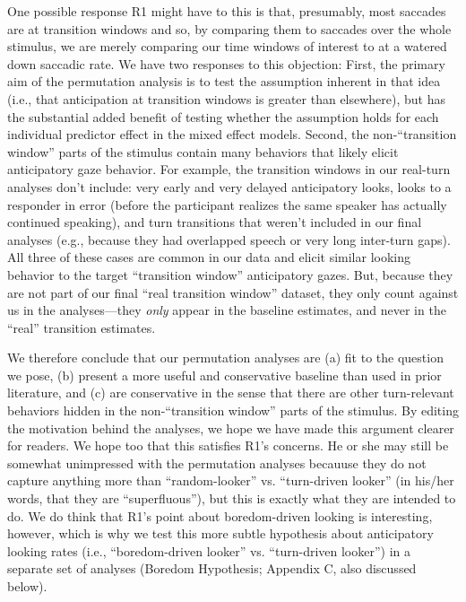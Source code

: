 \documentclass[11pt,a4paper]{letter} %
\begin{document}
\begin{letter}{}
\noindent One possible response R1 might have to this is that, presumably, most saccades are at transition windows and so, by comparing them to saccades over the whole stimulus, we are merely comparing our time windows of interest to at a watered down saccadic rate. We have two responses to this objection: First, the primary aim of the permutation analysis is to test the assumption inherent in that idea (i.e., that anticipation at transition windows is greater than elsewhere), but has the substantial added benefit of testing whether the assumption holds for each individual predictor effect in the mixed effect models. Second, the non-``transition window'' parts of the stimulus contain many behaviors that likely elicit anticipatory gaze behavior. For example, the transition windows in our real-turn analyses don't include: very early and very delayed anticipatory looks, looks to a responder in error (before the participant realizes the same speaker has actually continued speaking), and turn transitions that weren't included in our final analyses (e.g., because they had overlapped speech or very long inter-turn gaps). All three of these cases are common in our data and elicit similar looking behavior to the target ``transition window'' anticipatory gazes. But, because they are not part of our final ``real transition window'' dataset, they only count against us in the analyses---they \textit{only} appear in the baseline estimates, and never in the ``real'' transition estimates.

\noindent We therefore conclude that our permutation analyses are (a)  fit to the question we pose, (b) present a more useful and conservative baseline than used in prior literature, and (c) are conservative in the sense that there are other turn-relevant behaviors hidden in the non-``transition window'' parts of the stimulus. By editing the motivation behind the analyses, we hope we have made this argument clearer for readers. We hope too that this satisfies R1's concerns. He or she may still be somewhat unimpressed with the permutation analyses becauuse they do not capture anything more than ``random-looker'' vs. ``turn-driven looker'' (in his/her words, that they are ``superfluous''), but this is exactly what they are intended to do. We do think that R1's point about boredom-driven looking is interesting, however, which is why we test this more subtle hypothesis about anticipatory looking rates (i.e., ``boredom-driven looker'' vs. ``turn-driven looker'') in a separate set of analyses (Boredom Hypothesis; Appendix C, also discussed below).


\end{letter}
\end{document}
